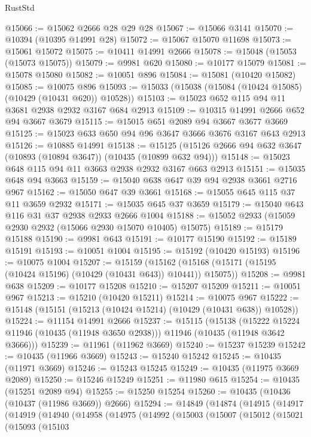 \begin{lexlean}{RustStd}
\begin{coremodule}
{\begin{coremodule}
{{{{{{{{{{{{{{{{{{{{{{{{{{{{{{{{{{{{{{{{{{{{{{{{{{{{{{{{{{{{{{{{{{{{{{{{{{{{{{@15066 := @15062 @2666 @28 @29 @28
@15067 := @15066 @3141
@15070 := @10394 (@10395 @14991 @28)
@15072 := @15067 @15070 @11698
@15073 := @15061 @15072
@15075 := @10411 @14991 @2666
@15078 := @15048 (@15053 (@15073 @15075))
@15079 := @9981 @620
@15080 := @10177 @15079
@15081 := @15078 @15080
@15082 := @10051 @896
@15084 := @15081 (@10420 @15082)
@15085 := @10075 @896
@15093 := @15033 (@15038 (@15084 (@10424 @15085) (@10429 (@10431 @620)) @10528))
@15103 := @15023 @652 @115 @94 @11 @3681 @2938 @2932 @3167 @684 @2913
@15109 := @10315 @14991 @2666 @652 @94 @3667 @3679
@15115 := @15015 @651 @2089 @94 @3667 @3677 @3669
@15125 := @15023 @633 @650 @94 @96 @3647 @3666 @3676 @3167 @643 @2913
@15126 := @10885 @14991
@15138 := @15125 (@15126 @2666 @94 @632 @3647 (@10893 (@10894 @3647)) (@10435 (@10899 @632 @94)))
@15148 := @15023 @648 @115 @94 @11 @3663 @2938 @2932 @3167 @663 @2913
@15151 := @15035 @648 @94 @3663
@15159 := @15040 @638 @647 @39 @94 @2938 @3661 @2716 @967
@15162 := @15050 @647 @39 @3661
@15168 := @15055 @645 @115 @37 @11 @3659 @2932
@15171 := @15035 @645 @37 @3659
@15179 := @15040 @643 @116 @31 @37 @2938 @2933 @2666 @1004
@15188 := @15052 @2933 (@15059 @2930 @2932 (@15066 @2930 @15070 @10405) @15075)
@15189 := @15179 @15188
@15190 := @9981 @643
@15191 := @10177 @15190
@15192 := @15189 @15191
@15193 := @10051 @1004
@15195 := @15192 (@10420 @15193)
@15196 := @10075 @1004
@15207 := @15159
    (@15162 (@15168 (@15171 (@15195 (@10424 @15196) (@10429 (@10431 @643)) @10441)) @15075))
@15208 := @9981 @638
@15209 := @10177 @15208
@15210 := @15207 @15209
@15211 := @10051 @967
@15213 := @15210 (@10420 @15211)
@15214 := @10075 @967
@15222 := @15148 (@15151 (@15213 (@10424 @15214) (@10429 (@10431 @638)) @10528))
@15224 := @11154 @14991 @2666
@15237 := @15115
    (@15138
      (@15222 @15224 @11946 (@10435 (@11948 @3650 @2938)))
      @11946
      (@10435 (@11948 @3642 @3666)))
@15239 := @11961 (@11962 @3669)
@15240 := @15237 @15239
@15242 := @10435 (@11966 @3669)
@15243 := @15240 @15242
@15245 := @10435 (@11971 @3669)
@15246 := @15243 @15245
@15249 := @10435 (@11975 @3669 @2089)
@15250 := @15246 @15249
@15251 := @11980 @615
@15254 := @10435 (@15251 @2089 @94)
@15255 := @15250 @15254
@15260 := @10435 (@10436 (@10437 (@11986 @3669)) @2666)
@15294 := @14849
    (@14874
      (@14915
        (@14917
          (@14919
            (@14940
              (@14958
                (@14975
                  (@14992
                    (@15003
                      (@15007
                        (@15012
                          (@15021
                            (@15093
                              (@15103
}}}}}}}}}}}}}}}}}}}}}}}}}}}}}}}}}}}}}}}}}}}}}}}}}}}}}}}}}}}}}}}}}}}}}}}}}}}}}}
\end{coremodule}}
\end{coremodule}
\end{lexlean}

